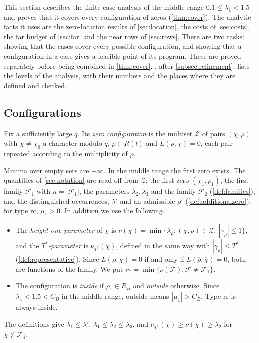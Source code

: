 \documentclass[11pt]{amsart}
\numberwithin{equation}{section}
\theoremstyle{plain}
\theoremstyle{definition}
\theoremstyle{remark}
\newcommand{\1}{\mathbf{1}}
\newcommand{\bchi}{\overline{\chi}}
\begin{document}
This section describes the finite case analysis of the middle range $0.1\le\lambda_1<1.5$ and
proves that it covers every configuration of zeros (\cref{thm:cover}). The analytic facts it
uses are the zero-location results of \cref{sec:location}, the costs of \cref{sec:costs}, the far
budget of \cref{sec:far} and the near rows of \cref{sec:rows}. There are two tasks:
showing that the cases cover every possible configuration, and showing that a
configuration in a case gives a feasible point of its program. These are proved
separately before being combined in \cref{thm:cover}. , after \cref{subsec:refinement}, lists the levels of the
analysis, with their numbers and the places where they are defined and checked.

\subsection{Configurations}\label{subsec:configurations}
\begin{definition}\label{def:configuration}
Fix a sufficiently large $q$. Its \emph{zero configuration} is the multiset $\mathcal Z$ of pairs $(\chi,\rho)$ with
$\chi\ne\chi_0$ a character modulo $q$, $\rho\in R(l)$ and $L(\rho,\chi)=0$, each pair repeated
according to the multiplicity of $\rho$.
\end{definition}

Minima over empty sets are $+\infty$. In the middle range the first zero exists.
The quantities of \cref{sec:notation} are read off from $\mathcal Z$: the first zero $(\chi_1,\rho_1)$,
the first family $\mathcal F_1$ with $n=|\mathcal F_1|$, the parameters $\lambda_2,\lambda_3$ and the family
$\mathcal F_2$ (\cref{def:families}), and the distinguished occurrences, $\lambda'$ and an admissible
$\rho'$ (\cref{def:additionalzero}); for type $\mathrm{rc}$, $\mu_1>0$. In addition we use the
following.
\begin{itemize}
  \item The \emph{height-one parameter} of $\chi$ is $\nu(\chi)=\min\{\lambda_\rho:(\chi,\rho)\in\mathcal
    Z,\ |\gamma_\rho|\le1\}$, and the \emph{$T^*$-parameter} is $\nu_{T^*}(\chi)$, defined in the same
    way with $|\gamma_\rho|\le T^*$ (\cref{def:representative}). Since $L(\rho,\chi)=0$ if and only if
    $L(\overline\rho,\bchi)=0$, both are functions of the family. We put
    $\nu_*=\min\{\nu(\mathcal F):\mathcal F\ne\mathcal F_1\}$.
  \item The configuration is \emph{inside} if $\rho_1\in R_B$ and \emph{outside} otherwise. Since
    $\lambda_1<1.5<C_B$ in the middle range, outside means $|\mu_1|>C_B$. Type $\mathrm{rr}$ is
    always inside.
\end{itemize}
The definitions give $\lambda_1\le\lambda'$, $\lambda_1\le\lambda_2\le\lambda_3$, and
$\nu_{T^*}(\chi)\ge\nu(\chi)\ge\lambda_2$ for $\chi\notin \mathcal F_1$.
\end{document}
